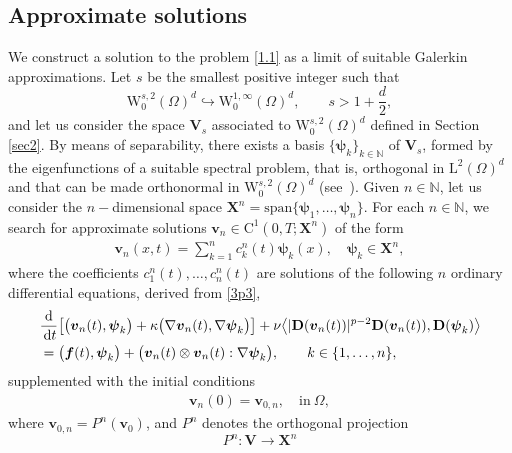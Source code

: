 \documentclass[12pt,reqno]{amsart}
\numberwithin{equation}{section}
\let\originalleft\left
\let\originalright\right
\renewcommand{\left}{\mathopen{}\mathclose\bgroup\originalleft}
\renewcommand{\right}{\aftergroup\egroup\originalright}
\theoremstyle{definition}
\def\1{\Omega}
\def\d{\mathrm{d}}
\def\dt{\,\mathrm{d}t}
\def\W{\mathrm{W}}
\def\L{\mathrm{L}}
\def\vv{\boldsymbol{v}}
\def\f{\boldsymbol{f}}
\def\C{\mathrm{C}}
\def\N{\mathbb{N}}
\def\bfX{\mathbf{X}}
\def\bfV{\mathbf{V}}
\def\bfD{\mathbf{D}}
\def\bfX{\mathbf{X}}
\def\bpsi{\boldsymbol{\psi}}
\begin{document}
\subsection{Approximate solutions}\label{Subs:GA}
We construct a solution to the problem \eqref{1.1} as a limit of suitable Galerkin approximations.
Let $s$ be the smallest positive integer such that
\begin{equation}\label{Ws2->W1infty:p}
\W^{s,2}_0(\1)^d\hookrightarrow \W^{1,\infty}_0(\1)^d,\qquad s>1+\frac{d}{2},
\end{equation}
and let us consider the space $\bfV_s$ associated to $\W^{s,2}_0(\1)^d$ defined in Section \ref{sec2}. %
		By means of separability, there exists a basis $\big\{\mathds{\bpsi}_{k}\big\}_{k\in\N}$ of $\bfV_s$, formed by the eigenfunctions of a suitable spectral problem, that is, orthogonal in $\L^2(\1)^d$ and that can be made orthonormal in $\W^{s,2}_0(\1)^d$ (see~\cite[Theorem~A.4.11]{Necas:book:1996}).
		Given
		$n\in\N$, let us consider the $n-$dimensional space $\bfX^{n}=\mathrm{span}\{\bpsi_{1}, \dots, \bpsi_{n}\}$.
		For each $n\in\N$, we search for approximate solutions {$\vv_n\in\C^1(0,T;\bfX^n)$} of the form
		\begin{align*}%
			\vv_n(x,t)= \sum_{k=1}^nc_k^n(t)\bpsi_{k}(x),\quad\bpsi_{k}\in \bfX^n,
		\end{align*}
		where the coefficients $c_{1}^n(t),\dots,c_{n}^n(t)$
		are solutions of the following $n$ ordinary differential equations, derived from \eqref{3p3},
\begin{equation}\label{5.2:p}%
\begin{split}
&
\frac{\d}{\dt}\left[\big(\vv_n(t),\bpsi_{k}\big)+\kappa\big(\nabla\vv_n(t),\nabla\bpsi_{k}\big)\right] + \nu\big<|\bfD(\vv_n(t))|^{p-2}\bfD(\vv_n(t)),\bfD(\bpsi_{k})\big>
 \\
&=
\big(\f(t),\bpsi_{k}\big) + \big(\vv_n(t)\otimes\vv_n(t):\nabla\bpsi_{k}\big), \qquad k\in\{1,\dots,n\},
\end{split}
\end{equation}
		supplemented with the initial conditions
		\begin{align}\label{5.3:p}
			\vv_n(0)=\vv_{0,n},\quad\mbox{in}\ \1,
		\end{align}
		where {$\vv_{0,n}=P^n(\vv _{0})$}, and $P^n$ denotes the orthogonal projection
\begin{equation}\label{orth:proj:n}
P^n:\bfV\longrightarrow \bfX^n
\end{equation}
\end{document}

